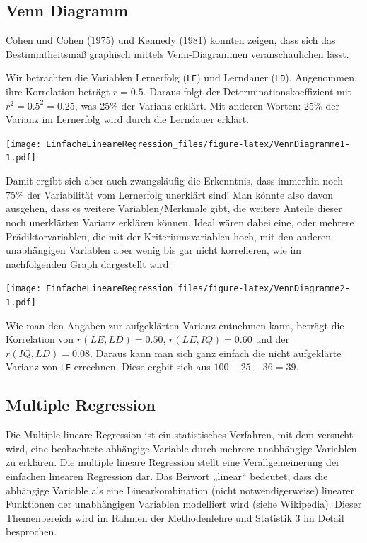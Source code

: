 \documentclass[
]{article}
\begin{document}
\subsection*{Venn Diagramm}\label{venn-diagramm}

Cohen und Cohen (1975) und Kennedy (1981) konnten zeigen, dass sich das Bestimmtheitsmaß graphisch mittels Venn-Diagrammen veranschaulichen lässt.

Wir betrachten die Variablen Lernerfolg (\texttt{LE}) und Lerndauer (\texttt{LD}). Angenommen, ihre Korrelation beträgt \(r = 0.5\). Daraus folgt der Determinationskoeffizient mit \(r^2 = 0.5^2 = 0.25\), was 25\% der Varianz erklärt. Mit anderen Worten: 25\% der Varianz im Lernerfolg wird durch die Lerndauer erklärt.

\texttt{[image: EinfacheLineareRegression\_files/figure-latex/VennDiagramme1-1.pdf]}

Damit ergibt sich aber auch zwangsläufig die Erkenntnis, dass immerhin noch 75\% der Variabilität vom Lernerfolg unerklärt sind! Man könnte also davon ausgehen, dass es weitere Variablen/Merkmale gibt, die weitere Anteile dieser noch unerklärten Varianz erklären können. Ideal wären dabei eine, oder mehrere Prädiktorvariablen, die mit der Kriteriumsvariablen hoch, mit den anderen unabhängigen Variablen aber wenig bis gar nicht korrelieren, wie im nachfolgenden Graph dargestellt wird:

\texttt{[image: EinfacheLineareRegression\_files/figure-latex/VennDiagramme2-1.pdf]}

Wie man den Angaben zur aufgeklärten Varianz entnehmen kann, beträgt die Korrelation von \(r(LE,LD) = 0.50\), \(r(LE,IQ) = 0.60\) und der \(r(IQ,LD) = 0.08\). Daraus kann man sich ganz einfach die nicht aufgeklärte Varianz von \texttt{LE} errechnen. Diese ergbit sich aus \(100 - 25 - 36 = 39\).

\subsection*{Multiple Regression}\label{multiple-regression}

Die Multiple lineare Regression ist ein statistisches Verfahren, mit dem versucht wird, eine beobachtete abhängige Variable durch mehrere unabhängige Variablen zu erklären. Die multiple lineare Regression stellt eine Verallgemeinerung der einfachen linearen Regression dar. Das Beiwort „linear`` bedeutet, dass die abhängige Variable als eine Linearkombination (nicht notwendigerweise) linearer Funktionen der unabhängigen Variablen modelliert wird (siehe Wikipedia). Dieser Themenbereich wird im Rahmen der Methodenlehre und Statistik 3 im Detail besprochen.
\end{document}
